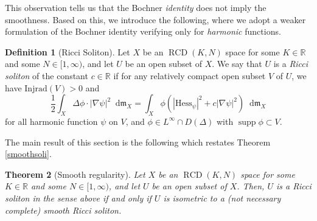 \documentclass[11pt,reqno]{amsart}
\newtheorem{theorem}{Theorem}[section]
\theoremstyle{definition}
\newtheorem{definition}[theorem]{Definition}
\numberwithin{equation}{section}
\newcommand{\di}{\mathop{}\!\mathrm{d}}
\newcommand{\meas}{\mathfrak{m}}
\DeclareMathOperator{\RCD}{RCD}
\DeclareMathOperator{\supp}{supp}
\begin{document}
        This observation tells us that the Bochner \textit{identity} does not imply the smoothness.
        Based on this, we introduce the following, where we adopt a weaker formulation of the Bochner identity verifying only for \textit{harmonic} functions.
\begin{definition}[Ricci Soliton]
    Let $X$ be an $\RCD(K, N)$ space for some $K \in \mathbb{R}$ and some $N \in [1, \infty)$, and let $U$ be an open subset of $X$. We say that $U$ is a \textit{Ricci soliton} of the constant $c \in \mathbb{R}$ if for any relatively compact open subset $V$ of $U$, we have $\mathrm{Injrad}(V)>0$ and
        \begin{equation}
            \frac{1}{2}\int_X\Delta \phi \cdot |\nabla \psi|^2\di \meas_X=\int_X\phi\left(|\mathrm{Hess}_{\psi}|^2+c|\nabla \psi|^2 \right)\di \meas_X
        \end{equation}
        for all harmonic function $\psi$ on $V$, and $\phi \in L^{\infty}\cap D(\Delta)$ with $\supp \phi \subset V$.
\end{definition}
The main result of this section is the following which restates Theorem \ref{smoothsoli}. 
\begin{theorem}[Smooth regularity]\label{thmsmooothreg}
    Let $X$ be an $\RCD(K, N)$ space for some $K \in \mathbb{R}$ and some $N \in [1, \infty)$, and let $U$ be an open subset of $X$.
    Then,     
    $U$ is a Ricci soliton in the sense above if and only if $U$ is isometric to a (not necessary complete) smooth Ricci soliton.
\end{theorem}
\end{document}
